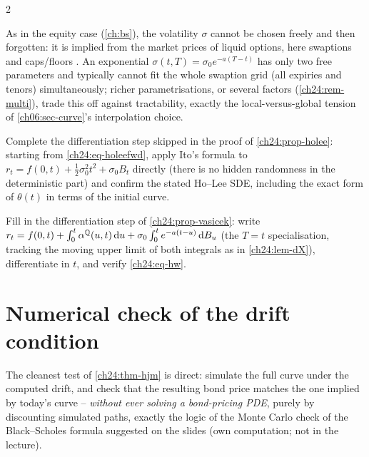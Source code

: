 \begin{paracol}{2}
\begin{remark}\label{ch24:rem-calib}
As in the equity case (\cref{ch:bs}), the volatility $\sigma$ cannot be chosen freely and then forgotten: it is implied from the market prices of liquid options, here swaptions and caps/floors . An exponential $\sigma(t,T)=\sigma_0e^{-a(T-t)}$ has only two free parameters and typically cannot fit the whole swaption grid (all expiries and tenors) simultaneously; richer parametrisations, or several factors (\cref{ch24:rem-multi}), trade this off against tractability, exactly the local-versus-global tension of \cref{ch06:sec-curve}'s interpolation choice.
\end{remark}

\begin{exercise}\label{ch24:ex-holeeproof}
Complete the differentiation step skipped in the proof of \cref{ch24:prop-holee}: starting from \eqref{ch24:eq-holeefwd}, apply Ito's formula to $r_t=f(0,t)+\tfrac12\sigma_0^2t^2+\sigma_0B_t$ directly (there is no hidden randomness in the deterministic part) and confirm the stated Ho--Lee SDE, including the exact form of $\theta(t)$ in terms of the initial curve.
\end{exercise}

\begin{exercise}\label{ch24:ex-hw}
Fill in the differentiation step of \cref{ch24:prop-vasicek}: write $r_t=f(0,t)+\int_0^t\alpha^{\mathbb{Q}}(u,t)\,\mathrm{d} u+\sigma_0\int_0^te^{-a(t-u)}\,\mathrm{d} B_u$ (the $T=t$ specialisation, tracking the moving upper limit of both integrals as in \cref{ch24:lem-dX}), differentiate in $t$, and verify \eqref{ch24:eq-hw}.
\end{exercise}

\section{Numerical check of the drift condition}\label{ch24:sec-numerics}

The cleanest test of \cref{ch24:thm-hjm} is direct: simulate the full curve under the computed drift, and check that the resulting bond price matches the one implied by today's curve -- \emph{without ever solving a bond-pricing PDE}, purely by discounting simulated paths, exactly the logic of the Monte Carlo check of the Black--Scholes formula suggested on the slides  (own computation; not in the lecture).


\end{paracol}
